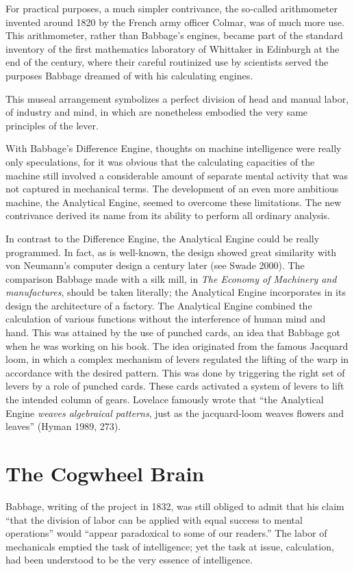 \documentclass[version=last,draft=true,paper=A4,portrait,twoside=true,twocolumn=false,headinclude=false,footinclude=false,fontsize=12,BCOR=20mm,DIV=calc,pagesize=auto,titlepage=firstiscover,mpinclude=true,open=right,chapterprefix=true,numbers=autoendperiod,headsepline=false,headings=twolinechapter,parskip=false]{scrbook}
\begin{document}
For practical purposes, a much simpler contrivance, the so-called
arithmometer invented around 1820 by the French army officer Colmar, was of
much more use. This arithmometer, rather than Babbage's engines, became
part of the standard inventory of the first mathematics laboratory of
Whittaker in Edinburgh at the end of the century, where their careful
routinized use by scientists served the purposes Babbage dreamed of with
his calculating engines.

This museal arrangement symbolizes a perfect division of head and manual
labor, of industry and mind, in which are nonetheless embodied the very
same principles of the lever. 

With Babbage's Difference Engine, thoughts on machine intelligence were
really only speculations, for it was obvious that the calculating
capacities of the machine still involved a considerable amount of separate
mental activity that was not captured in mechanical terms. The development
of an even more ambitious machine, the Analytical Engine, seemed to
overcome these limitations. The new contrivance derived its name from its
ability to perform all ordinary analysis.

In contrast to the Difference Engine, the Analytical Engine could be really
programmed. In fact, as is well-known, the design showed great similarity
with von Neumann's computer design a century later (see Swade 2000). The
comparison Babbage made with a silk mill, in \emph{The Economy of Machinery and
manufactures}, should be taken literally; the Analytical Engine incorporates
in its design the architecture of a factory. The Analytical Engine combined
the calculation of various functions without the interference of human mind
and hand. This was attained by the use of punched cards, an idea that
Babbage got when he was working on his book. The idea originated from the
famous Jacquard loom, in which a complex mechanism of levers regulated the
lifting of the warp in accordance with the desired pattern. This was done
by triggering the right set of levers by a role of punched cards. These
cards activated a system of levers to lift the intended column of gears.
Lovelace famously wrote that ``the Analytical Engine \emph{weaves algebraical
patterns}, just as the jacquard-loom weaves flowers and leaves'' (Hyman
1989, 273).
\section{The Cogwheel Brain}
\label{sec:orgba54190}
Babbage, writing of the project in 1832, was still obliged to admit that his
claim ``that the division of labor can be applied with equal success to
mental operations'' would ``appear paradoxical to some of our readers.''
The labor of mechanicals emptied the task of intelligence; yet the task at
issue, calculation, had been understood to be the very essence of
intelligence.
\end{document}
